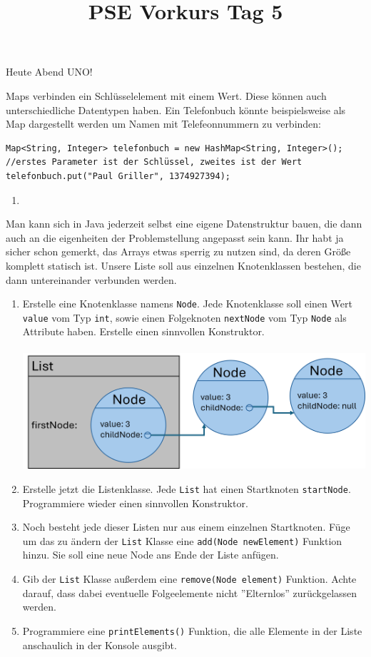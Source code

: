 \documentclass{../../sheet}
\title{PSE Vorkurs Tag 5}
\begin{document}
\maketitle
Heute Abend UNO!

\newpage
{}
Maps verbinden ein Schlüsselelement mit einem Wert. Diese können auch unterschiedliche Datentypen haben. Ein Telefonbuch könnte beispielsweise als Map dargestellt werden um Namen mit Telefeonnummern zu verbinden:
\begin{verbatim}
Map<String, Integer> telefonbuch = new HashMap<String, Integer>();
//erstes Parameter ist der Schlüssel, zweites ist der Wert
telefonbuch.put("Paul Griller", 1374927394);
\end{verbatim}

\begin{enumerate}
    \item
\end{enumerate}

\newpage
{}
Man kann sich in Java jederzeit selbst eine eigene Datenstruktur bauen, die dann auch an die eigenheiten der Problemstellung angepasst sein kann. Ihr habt ja sicher schon gemerkt, das Arrays etwas sperrig zu nutzen sind, da deren Größe komplett statisch ist. Unsere Liste soll aus einzelnen Knotenklassen bestehen, die dann untereinander verbunden werden.
\begin{enumerate}
    \item Erstelle eine Knotenklasse namens \texttt{Node}. Jede Knotenklasse soll einen Wert \texttt{value} vom Typ \texttt{int}, sowie einen Folgeknoten \texttt{nextNode} vom Typ \texttt{Node} als Attribute haben. Erstelle einen sinnvollen Konstruktor.\\\\
    \includegraphics[width=\linewidth]{img/linkedlist.png}
    \item Erstelle jetzt die Listenklasse. Jede \texttt{List} hat einen Startknoten \texttt{startNode}. Programmiere wieder einen sinnvollen Konstruktor.
    \item Noch besteht jede dieser Listen nur aus einem einzelnen Startknoten. Füge um das zu ändern der \texttt{List} Klasse eine \texttt{add(Node newElement)} Funktion hinzu. Sie soll eine neue Node ans Ende der Liste anfügen. 
    \item Gib der \texttt{List} Klasse außerdem eine \texttt{remove(Node element)} Funktion. Achte darauf, dass dabei eventuelle Folgeelemente nicht ''Elternlos'' zurückgelassen werden. 
    \item Programmiere eine \texttt{printElements()} Funktion, die alle Elemente in der Liste anschaulich in der Konsole ausgibt.
\end{enumerate}
\end{document}
